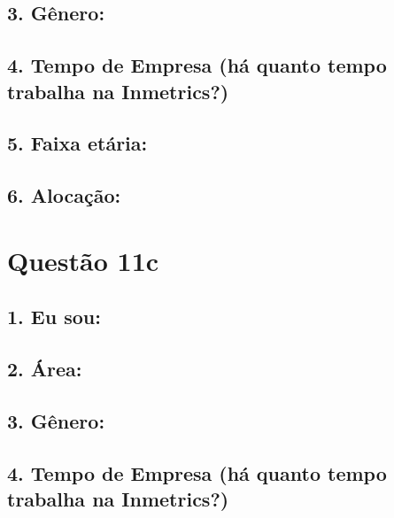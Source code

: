 \documentclass[]{book}
\begin{document}
\hypertarget{genero-13}{%
\subsection{3. Gênero:}\label{genero-13}}

\hypertarget{tempo-de-empresa-ha-quanto-tempo-trabalha-na-inmetrics-13}{%
\subsection{4. Tempo de Empresa (há quanto tempo trabalha na Inmetrics?)}\label{tempo-de-empresa-ha-quanto-tempo-trabalha-na-inmetrics-13}}

\hypertarget{faixa-etaria-13}{%
\subsection{5. Faixa etária:}\label{faixa-etaria-13}}

\hypertarget{alocacao-13}{%
\subsection{6. Alocação:}\label{alocacao-13}}

\hypertarget{questao-11c}{%
\section{Questão 11c}\label{questao-11c}}

\hypertarget{eu-sou-14}{%
\subsection{1. Eu sou:}\label{eu-sou-14}}

\hypertarget{area-14}{%
\subsection{2. Área:}\label{area-14}}

\hypertarget{genero-14}{%
\subsection{3. Gênero:}\label{genero-14}}

\hypertarget{tempo-de-empresa-ha-quanto-tempo-trabalha-na-inmetrics-14}{%
\subsection{4. Tempo de Empresa (há quanto tempo trabalha na Inmetrics?)}\label{tempo-de-empresa-ha-quanto-tempo-trabalha-na-inmetrics-14}}
\end{document}
